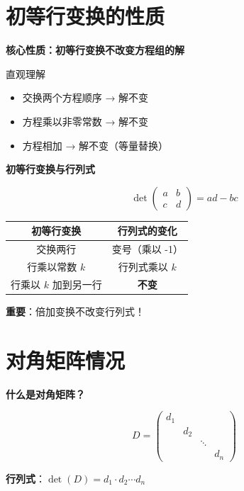 \documentclass[aspectratio=169,12pt]{beamer}
\begin{document}
\section{初等行变换的性质}

\begin{frame}
\fontsize{11}{13}\selectfont
\centerline{\textbf{核心性质：初等行变换不改变方程组的解}}

\bigskip
\pause
\centerline{直观理解}
\begin{itemize}
    \item 交换两个方程顺序 → 解不变
    \item 方程乘以非零常数 → 解不变
    \item 方程相加 → 解不变（等量替换）
\end{itemize}
\end{frame}

\begin{frame}
\fontsize{10}{12}\selectfont
\centerline{\textbf{初等行变换与行列式}}

\[
\det\begin{pmatrix} a & b \\ c & d \end{pmatrix} = ad - bc
\]

\begin{center}
\begin{tabular}{|c|c|}
\hline
初等行变换 & 行列式的变化 \\
\hline
交换两行 & 变号（乘以 -1） \\
\hline
行乘以常数 $k$ & 行列式乘以 $k$ \\
\hline
行乘以 $k$ 加到另一行 & \textbf{不变} \\
\hline
\end{tabular}
\end{center}

\pause
\bigskip
\centerline{\textbf{重要}：倍加变换不改变行列式！}
\end{frame}

\section{对角矩阵情况}

\begin{frame}
\fontsize{11}{13}\selectfont
\centerline{\textbf{什么是对角矩阵？}}

\[
D = \begin{pmatrix}
d_1 & & \\
& d_2 & \\
& & \ddots \\
& & & d_n
\end{pmatrix}
\]

\pause
\bigskip
\centerline{\textbf{行列式}：$\det(D) = d_1 \cdot d_2 \cdots d_n$}
\end{frame}
\end{document}

